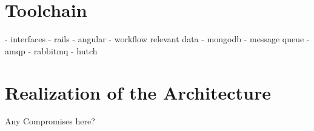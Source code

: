 
\section{Toolchain} %
\label{sec:toolchain}

	- interfaces
		- rails
    - angular
  - workflow relevant data
    - mongodb
	- message queue
    - amqp
      - rabbitmq
      - hutch


\section{Realization of the Architecture} %
\label{sec:realization_of_the_architecture}
Any Compromises here?
